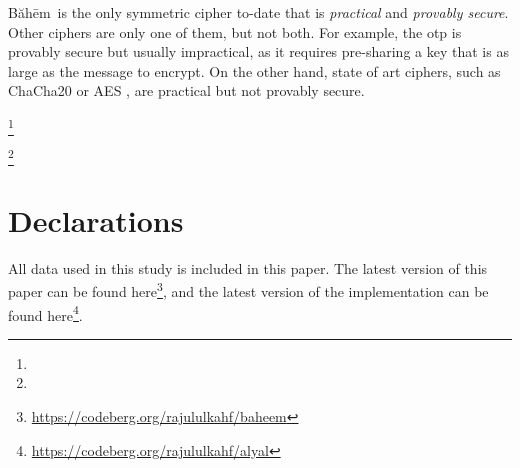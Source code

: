 \documentclass[twocolumn,hidelinks]{article}
\newcommand{\baheem}{Băhēm}
\newcommand\blfootnote[1]{%
  \begingroup
  \renewcommand\thefootnote{}\footnote{#1}%
  \addtocounter{footnote}{-1}%
  \endgroup
}
\begin{document}
\baheem\ is the only symmetric cipher to-date that is \emph{practical} and
\emph{provably secure}.  Other ciphers are only one of them, but not both.
For example, the \gls{otp} is provably secure but usually impractical, as
it requires pre-sharing a key that is as large as the message to encrypt.
On the other hand, state of art ciphers, such as ChaCha20
or AES \cite{aes}, are practical but not provably secure.

\blfootnote{}
\blfootnote{\vspace{-1.5em}\doclicenseThis}
\vfill
\break

\section*{Declarations}
All data used in this study is included in this paper.  The latest version
of this paper can be found
here\footnote{\url{https://codeberg.org/rajululkahf/baheem}}, and the
latest version of the implementation can be found
here\footnote{\url{https://codeberg.org/rajululkahf/alyal}}.
\end{document}
